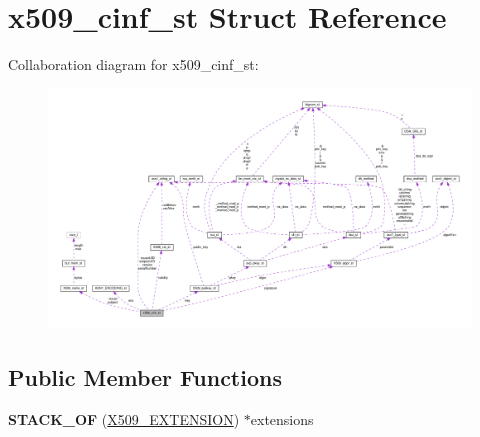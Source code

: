 \hypertarget{structx509__cinf__st}{}\section{x509\+\_\+cinf\+\_\+st Struct Reference}
\label{structx509__cinf__st}


Collaboration diagram for x509\+\_\+cinf\+\_\+st\+:
\nopagebreak
\begin{figure}[H]
\begin{center}
\leavevmode
\includegraphics[width=350pt]{structx509__cinf__st__coll__graph}
\end{center}
\end{figure}
\subsection*{Public Member Functions}
\begin{DoxyCompactItemize}
\item 
\mbox{\label{structx509__cinf__st_a52555b9f3c8734d431ac95712f68c13e}} 
{\bfseries S\+T\+A\+C\+K\+\_\+\+OF} (\hyperlink{structX509__extension__st}{X509\+\_\+\+E\+X\+T\+E\+N\+S\+I\+ON}) $\ast$extensions
\end{DoxyCompactItemize}
